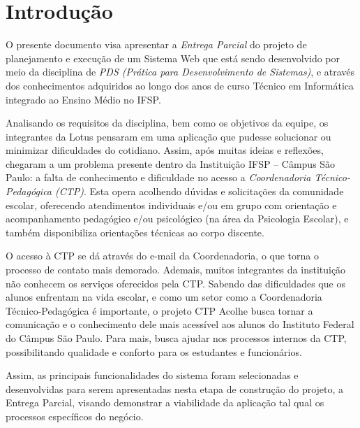 \documentclass[12pt,a4paper]{article}
\renewcommand{\cfttoctitlefont}{\large\bfseries}
\begin{document}
\newpage

\renewcommand{\cfttoctitlefont}{\hfill\large\bfseries\centerline} %
\renewcommand{\cftaftertoctitle}{\hfill}
\tableofcontents
\thispagestyle{empty}

\newpage

\section{Introdução}
\pagestyle{plain}

O presente documento visa apresentar a \textit{Entrega Parcial} do projeto de planejamento e execução de um \gls{Sistema Web} que está sendo desenvolvido por meio da disciplina de \textit{PDS (Prática para Desenvolvimento de Sistemas)}, e através dos conhecimentos adquiridos ao longo dos anos de curso Técnico em Informática integrado ao Ensino Médio no \ac{IFSP}. 

Analisando os requisitos da disciplina, bem como os objetivos da equipe, os integrantes da Lotus pensaram em uma aplicação que pudesse solucionar ou minimizar dificuldades do cotidiano. Assim, após muitas ideias e reflexões, chegaram a um problema presente dentro da Instituição \ac{IFSP} – Câmpus São Paulo: a falta de conhecimento e dificuldade no acesso a \textit{Coordenadoria Técnico-Pedagógica (CTP)}. Esta opera acolhendo dúvidas e solicitações da comunidade escolar, oferecendo atendimentos individuais e/ou em grupo com orientação e acompanhamento pedagógico e/ou psicológico (na área da Psicologia Escolar), e também disponibiliza orientações técnicas ao corpo discente. 

O acesso à \ac{CTP} se dá através do e-mail da Coordenadoria, o que torna o processo de contato mais demorado. Ademais, muitos integrantes da instituição não conhecem os serviços oferecidos pela \ac{CTP}. Sabendo das dificuldades que os alunos enfrentam na vida escolar, e como um setor como a Coordenadoria Técnico-Pedagógica é importante, o projeto \ac{CTP} Acolhe busca tornar a comunicação e o conhecimento dele mais acessível aos alunos do Instituto Federal do Câmpus São Paulo. Para mais, busca ajudar nos processos internos da \ac{CTP}, possibilitando qualidade e conforto para os estudantes e funcionários.   

Assim, as principais funcionalidades do sistema foram selecionadas e desenvolvidas para serem apresentadas nesta etapa de construção do projeto, a Entrega Parcial, visando demonstrar a viabilidade da aplicação tal qual os processos específicos do negócio. 
\end{document}
